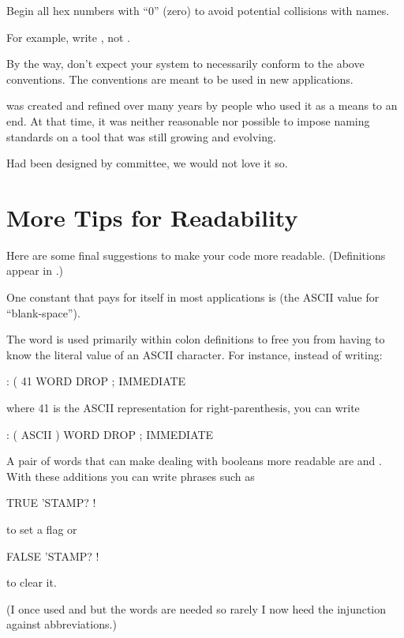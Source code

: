 \begin{tip}
Begin all hex numbers with ``0'' (zero) to avoid potential collisions
with names.
\end{tip}
For example, write , not .

By the way, don't expect your \Forth{} system to necessarily conform
to the above conventions.  The conventions are meant to be used in
new applications.

\Forth{} was created and refined over many years by people who used it
as a means to an end.  At that time, it was neither reasonable nor
possible to impose naming standards on a tool that was still growing
and evolving.

Had \Forth{} been designed by committee, we would not love it so.

\section{More Tips for Readability}

Here are some final suggestions to make your code more readable.
(Definitions appear in .)

One constant that pays for itself in most applications is
(the ASCII value for ``blank-space'').

The word  is used primarily within colon definitions to
free you from having to know the literal value of an ASCII character.
For instance, instead of writing:
\begin{Code}
: (    41 WORD  DROP ;  IMMEDIATE
\end{Code}
where 41 is the ASCII representation for right-parenthesis, you can
write
\begin{Code}
: (    ASCII ) WORD  DROP ;  IMMEDIATE
\end{Code}
A pair of words that can make dealing with booleans more readable are
 and .  With these additions you can write
phrases such as

\begin{Code}
TRUE 'STAMP? !
\end{Code}
to set a flag or
\begin{Code}
FALSE 'STAMP? !
\end{Code}
to clear it.

(I once used  and \forth{,} but the words are
needed so rarely I now heed the injunction against abbreviations.)

